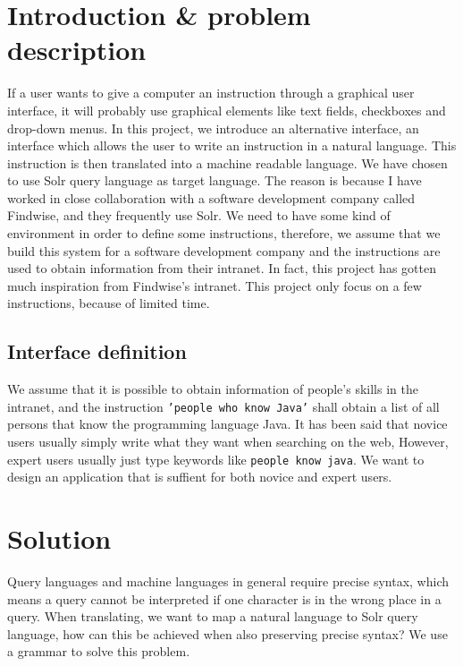 \documentclass[
10pt, %
a4paper, %
oneside, %
headinclude,footinclude, %
BCOR5mm, %
]{scrartcl}
\begin{document}
\section{Introduction \& problem description}
If a user wants to give a computer an instruction through a graphical user interface, it will probably use graphical elements like text fields, checkboxes and drop-down menus. In this project, we introduce an alternative interface, an interface which allows the user to write an instruction in a natural language.
\newline
\newline
This instruction is then translated into a machine readable language. We have chosen to use Solr query language as target language. The reason is because I have worked in close collaboration with a software development company called Findwise, and they frequently use Solr.
\newline
\newline
We need to have some kind of environment in order to define some instructions, therefore, we assume that we build this system for a software development company and the instructions are used to obtain information from their intranet. In fact, this project has gotten much inspiration from Findwise's intranet. This project only focus on a few instructions, because of limited time.

\subsection{Interface definition}
We assume that it is possible to obtain information of people's skills in the intranet, and the instruction \texttt{'people who know Java'} shall obtain a list of all persons that know the programming language Java. It has been said that novice users usually simply write what they want when searching on the web, 
\newline
\newline
However, expert users usually just type keywords like \texttt{people know java}. We want to design an application that is suffient for both novice and expert users.

\section{Solution}
Query languages and machine languages in general require precise syntax, which means a query cannot be interpreted if one character is in the wrong place in a query.
\newline
\newline
When translating, we want to map a natural language to Solr query language, how can this be achieved when also preserving precise syntax?
\newline
\newline
We use a grammar to solve this problem.
\end{document}
